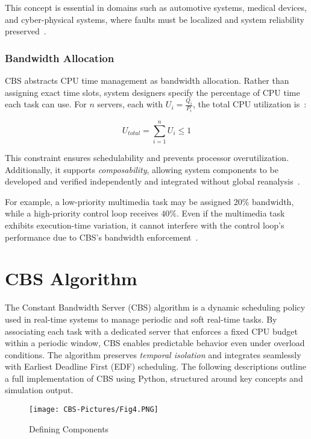 \documentclass[conference]{IEEEtran}
\begin{document}
This concept is essential in domains such as automotive systems, medical devices, and cyber-physical systems, where faults must be localized and system reliability preserved~\cite{buttazzo2011hard}.

\subsubsection{Bandwidth Allocation}

CBS abstracts CPU time management as bandwidth allocation. Rather than assigning exact time slots, system designers specify the percentage of CPU time each task can use. For \( n \) servers, each with \( U_i = \frac{Q_i}{P_i} \), the total CPU utilization is~\cite{abeni1998integrating}:

\[
U_{total} = \sum_{i=1}^{n} U_i \leq 1
\]

This constraint ensures schedulability and prevents processor overutilization. Additionally, it supports \textit{composability}, allowing system components to be developed and verified independently and integrated without global reanalysis~\cite{buttazzo2011hard}.

For example, a low-priority multimedia task may be assigned \( 20\% \) bandwidth, while a high-priority control loop receives \( 40\% \). Even if the multimedia task exhibits execution-time variation, it cannot interfere with the control loop’s performance due to CBS’s bandwidth enforcement~\cite{baruah2004dynamic}.



\section{\textbf{CBS Algorithm}}

The Constant Bandwidth Server (CBS) algorithm is a dynamic scheduling policy used in real-time systems to manage periodic and soft real-time tasks. By associating each task with a dedicated server that enforces a fixed CPU budget within a periodic window, CBS enables predictable behavior even under overload conditions. The algorithm preserves \textit{temporal isolation} and integrates seamlessly with Earliest Deadline First (EDF) scheduling. The following descriptions outline a full implementation of CBS using Python, structured around key concepts and simulation output.

\vspace{0.1cm}
\begin{figure}[h]
  \centering
  \texttt{[image: CBS-Pictures/Fig4.PNG]}
  \caption{Defining Components}
  \label{fig:image_label}
\end{figure}
\end{document}
